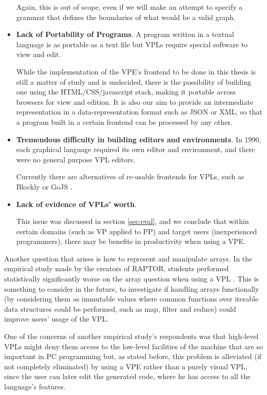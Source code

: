 \begin{itemsize}
\begin{itemize}
Again, this is out of scope, even
if we will make an attempt to specify a grammar that defines the boundaries of
what would be a valid graph.
  \item \textbf{Lack of Portability of Programs}. A program written in a textual language
is as portable as a text file but VPLs require special software to view and edit.

While the implementation of the VPE's frontend to be done in this thesis is still a matter
of study and is undecided, there is the possibility of building one using the
HTML/CSS/javascript stack, making it portable across browsers for view and edition.
It is also our aim to provide an intermediate representation in a data-representation
format such as JSON or XML, so that a program built in a certain frontend can
be processed by any other.
  \item \textbf{Tremendous difficulty in building editors and environments}.
In 1990, each graphical language required its own editor and environment, and there were no general purpose
VPL editors.

Currently there are alternatives of re-usable frontends for VPLs,
such as Blockly \cite{blockly} or GoJS \cite{gojs}.
  \item \textbf{Lack of evidence of VPLs' worth}.

This issue was discussed in section
\ref{sec:eval}, and we conclude that within certain domains (such as VP applied
to PP) and target users (inexperienced programmers), there may be benefits in
productivity when using a VPE.
\end{itemize}

Another question that arises is how to represent and manipulate arrays. In the
empirical study made by the creators of RAPTOR, students performed statistically
significantly worse on the array question when using a VPL \cite{Cardellini2002}.
This is something to consider in the future, to investigate if handling arrays
functionally (by considering them as immutable values where common functions over
iterable data structures could be performed, such as map, filter and reduce)
could improve users' usage of the VPL.

One of the concerns of another empirical study's respondents was that high-level VPLs might deny
them access to the low-level facilities of the machine that are so important in PC programming \cite{Whitley1997}
but, as stated before, this problem is alleviated (if not completely eliminated)
by using a VPE rather than a purely visual VPL, since the user can later
edit the generated code, where he has access to all the language's features.


\end{itemsize}

